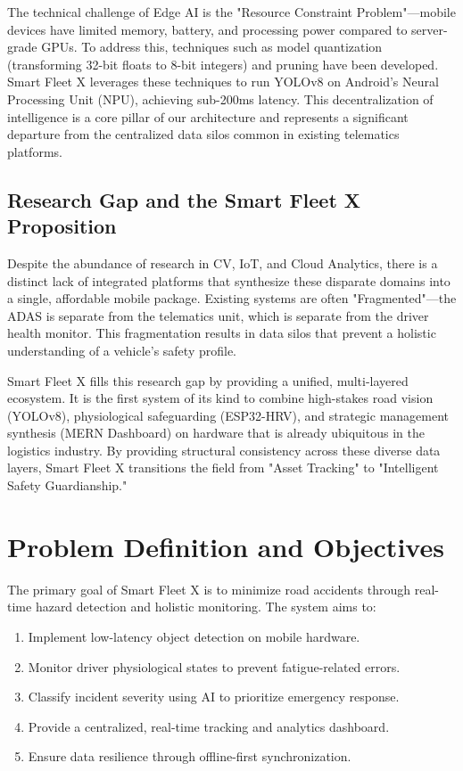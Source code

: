 \documentclass[conference]{IEEEtran}
\begin{document}
The technical challenge of Edge AI is the "Resource Constraint Problem"—mobile devices have limited memory, battery, and processing power compared to server-grade GPUs. To address this, techniques such as model quantization (transforming 32-bit floats to 8-bit integers) and pruning have been developed. Smart Fleet X leverages these techniques to run YOLOv8 on Android's Neural Processing Unit (NPU), achieving sub-200ms latency. This decentralization of intelligence is a core pillar of our architecture and represents a significant departure from the centralized data silos common in existing telematics platforms.

\subsection{Research Gap and the Smart Fleet X Proposition}
Despite the abundance of research in CV, IoT, and Cloud Analytics, there is a distinct lack of integrated platforms that synthesize these disparate domains into a single, affordable mobile package. Existing systems are often "Fragmented"—the ADAS is separate from the telematics unit, which is separate from the driver health monitor. This fragmentation results in data silos that prevent a holistic understanding of a vehicle's safety profile.

Smart Fleet X fills this research gap by providing a unified, multi-layered ecosystem. It is the first system of its kind to combine high-stakes road vision (YOLOv8), physiological safeguarding (ESP32-HRV), and strategic management synthesis (MERN Dashboard) on hardware that is already ubiquitous in the logistics industry. By providing structural consistency across these diverse data layers, Smart Fleet X transitions the field from "Asset Tracking" to "Intelligent Safety Guardianship."

\section{Problem Definition and Objectives}
The primary goal of Smart Fleet X is to minimize road accidents through real-time hazard detection and holistic monitoring. The system aims to:
\begin{enumerate}
    \item Implement low-latency object detection on mobile hardware.
    \item Monitor driver physiological states to prevent fatigue-related errors.
    \item Classify incident severity using AI to prioritize emergency response.
    \item Provide a centralized, real-time tracking and analytics dashboard.
    \item Ensure data resilience through offline-first synchronization.
\end{enumerate}
\end{document}
